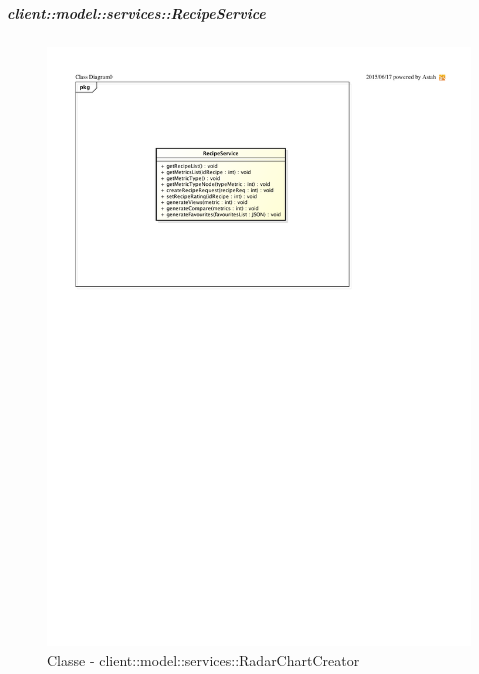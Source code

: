 		\subparagraph{client::model::services::RecipeService} %
		\label{subp:client_model_services_recipeservice}
		\begin{figure}[htbp]
				\centering
				\centerline{\includegraphics[scale=1.17]{./images/client/classes/model/recipe_service.pdf}}
				\caption{Classe - client::model::services::RadarChartCreator}
			\end{figure}
